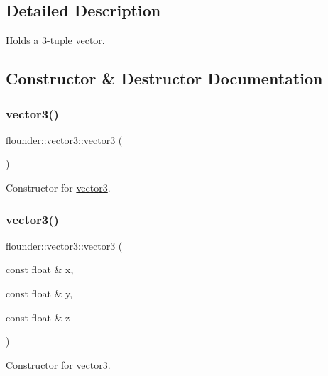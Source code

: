 \subsection{Detailed Description}
Holds a 3-\/tuple vector. 



\subsection{Constructor \& Destructor Documentation}
\mbox{\label{classflounder_1_1vector3_a3b12a90a4b4350ccd42d7430b7c64fb8}} 
\subsubsection{\texorpdfstring{vector3()}{vector3()}\hspace{0.1cm}{\footnotesize\ttfamily [1/4]}}
{\footnotesize\ttfamily flounder\+::vector3\+::vector3 (\begin{DoxyParamCaption}{ }\end{DoxyParamCaption})}



Constructor for \hyperlink{classflounder_1_1vector3}{vector3}. 

\mbox{\label{classflounder_1_1vector3_a49b89a27fc3ec6d8ab67c786c5a3ca33}} 
\subsubsection{\texorpdfstring{vector3()}{vector3()}\hspace{0.1cm}{\footnotesize\ttfamily [2/4]}}
{\footnotesize\ttfamily flounder\+::vector3\+::vector3 (\begin{DoxyParamCaption}\item[{const float \&}]{x,  }\item[{const float \&}]{y,  }\item[{const float \&}]{z }\end{DoxyParamCaption})}



Constructor for \hyperlink{classflounder_1_1vector3}{vector3}. 



